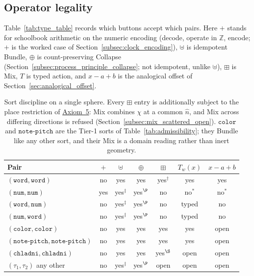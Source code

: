 \documentclass[12pt, a4paper]{article}
\begin{document}
\subsection{Operator legality}
\label{subsec:type_table}
Table~\ref{tab:type_table} records which buttons accept which pairs.
Here $+$ stands for schoolbook arithmetic on the numeric encoding
(decode, operate in $\mathbb{Z}$, encode; $+$ is the worked case of
Section~\ref{subsec:clock_encoding}), $\uplus$ is
idempotent Bundle, $\oplus$ is count-preserving Collapse
(Section~\ref{subsec:process_principle_collapse}; not idempotent,
unlike $\uplus$), $\boxplus$ is Mix, $T$ is typed action, and $x-a+b$ is the analogical
offset of Section~\ref{sec:analogical_offset}.

\begin{table}[h]
\centering
\begin{tabular}{lcccccc}
\hline
Pair & $+$ & $\uplus$ & $\oplus$ & $\boxplus$ & $T_w(x)$ & $x-a+b$ \\
\hline
$(\mathtt{word},\mathtt{word})$ & no & yes & yes & yes$^{\dagger}$ & yes & yes \\
$(\mathtt{num},\mathtt{num})$   & yes & yes$^{\ddagger}$ & yes$^{\P}$ & no  & no$^{*}$ & no$^{*}$ \\
$(\mathtt{word},\mathtt{num})$ & no & yes$^{\ddagger}$ & yes$^{\P}$ & no & typed & no \\
$(\mathtt{num},\mathtt{word})$ & no & yes$^{\ddagger}$ & yes$^{\P}$ & no & typed & no \\
$(\mathtt{color},\mathtt{color})$ & no & yes & yes & yes & yes & open \\
$(\mathtt{note\text{-}pitch},\mathtt{note\text{-}pitch})$ & no & yes & yes & yes & yes & open \\
$(\mathtt{chladni},\mathtt{chladni})$ & no & yes & yes & yes$^{\S}$ & open & open \\
$(\tau_1,\tau_2)$ any other & no & yes$^{\ddagger}$ & yes$^{\P}$ & open & open & open \\
\hline
\end{tabular}
\caption{Sort discipline on a single sphere. Every $\boxplus$ entry is
additionally subject to the place restriction of
\hyperref[subsec:axiom_interference]{Axiom~5}: Mix combines $\chi$ at a common
$\hat n$, and Mix across differing directions is refused
(Section~\ref{subsec:mix_scattered_open}).
$\mathtt{color}$ and $\mathtt{note\text{-}pitch}$ are the Tier-1 sorts of
Table~\ref{tab:admissibility}; they Bundle like any other sort, and
their Mix is a domain reading rather than inert geometry.
}
\end{table}
\end{document}
